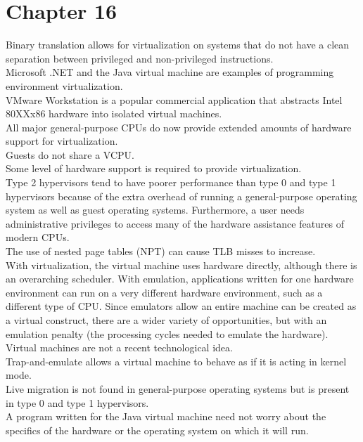 \documentclass[12pt]{article}
\begin{document}
\section*{\centering Chapter 16}
Binary translation allows for virtualization on systems that do not have a clean separation between privileged and non-privileged instructions.\\[2mm]
Microsoft .NET and the Java virtual machine are examples of programming environment virtualization.\\[2mm]
VMware Workstation is a popular commercial application that abstracts Intel 80XXx86 hardware into isolated virtual machines.\\[2mm]
All major general-purpose CPUs do now provide extended amounts of hardware support for virtualization.\\[2mm]
Guests do not share a VCPU.\\[2mm]
Some level of hardware support is required to provide virtualization.\\[2mm]
Type 2 hypervisors tend to have poorer performance than type 0 and type 1 hypervisors because of the extra overhead of running a general-purpose operating system as well as guest operating systems. Furthermore, a user needs administrative privileges to access many of the hardware assistance features of modern CPUs.\\[2mm]
The use of nested page tables (NPT) can cause TLB misses to increase.\\[2mm]
With virtualization, the virtual machine uses hardware directly, although there is an overarching scheduler. With emulation, applications written for one hardware environment can run on a very different hardware environment, such as a different type of CPU. Since emulators allow an entire machine can be created as a virtual construct, there are a wider variety of opportunities, but with an emulation penalty (the processing cycles needed to emulate the hardware).\\[2mm]
Virtual machines are not a recent technological idea.\\[2mm]
Trap-and-emulate allows a virtual machine to behave as if it is acting in kernel mode.\\[2mm]
Live migration is not found in general-purpose operating systems but is present in type 0 and type 1 hypervisors.\\[2mm]
A program written for the Java virtual machine need not worry about the specifics of the hardware or the operating system on which it will run.\\[2mm]
\end{document}
